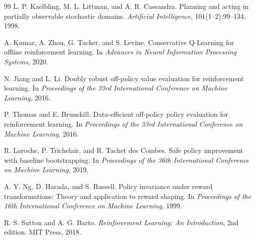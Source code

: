 \documentclass[11pt,a4paper,fontset=none]{ctexart}
\newcommand{\1}{\mathbb{I}}
\begin{document}
\begin{thebibliography}{99}
L. P. Kaelbling, M. L. Littman, and A. R. Cassandra.
Planning and acting in partially observable stochastic domains.
\emph{Artificial Intelligence}, 101(1--2):99--134, 1998.

A. Kumar, A. Zhou, G. Tucker, and S. Levine.
Conservative Q-Learning for offline reinforcement learning.
In \emph{Advances in Neural Information Processing Systems}, 2020.

N. Jiang and L. Li.
Doubly robust off-policy value evaluation for reinforcement learning.
In \emph{Proceedings of the 33rd International Conference on Machine Learning}, 2016.

P. Thomas and E. Brunskill.
Data-efficient off-policy policy evaluation for reinforcement learning.
In \emph{Proceedings of the 33rd International Conference on Machine Learning}, 2016.

R. Laroche, P. Trichelair, and R. Tachet des Combes.
Safe policy improvement with baseline bootstrapping.
In \emph{Proceedings of the 36th International Conference on Machine Learning}, 2019.

A. Y. Ng, D. Harada, and S. Russell.
Policy invariance under reward transformations: Theory and application to reward shaping.
In \emph{Proceedings of the 16th International Conference on Machine Learning}, 1999.

R. S. Sutton and A. G. Barto.
\emph{Reinforcement Learning: An Introduction}, 2nd edition.
MIT Press, 2018.
\end{thebibliography}
\end{document}
